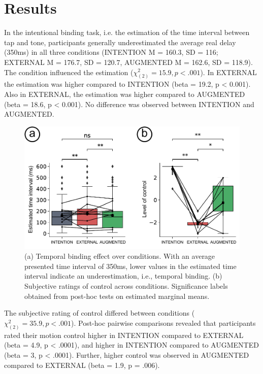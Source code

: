 \section{Results}
In the intentional binding task, i.e. the estimation of the time interval between tap and tone, participants generally underestimated the average real delay (350ms) in all three conditions (INTENTION M = 160.3, SD = 116; EXTERNAL M = 176.7, SD = 120.7, AUGMENTED M = 162.6, SD = 118.9). The condition influenced the estimation (${\chi^{2}_{(2)}} = 15.9, p < .001$). In EXTERNAL the estimation was higher compared to INTENTION (beta = 19.2, p < 0.001). Also in EXTERNAL, the estimation was higher compared to AUGMENTED (beta = 18.6, p < 0.001). No difference was observed between INTENTION and AUGMENTED.

\begin{figure}
    \centering
    \includegraphics[width=\columnwidth]{figures/behavioral_results.pdf}
    \caption{(a) Temporal binding effect over conditions. With an average presented time interval of 350ms, lower values in the estimated time interval indicate an underestimation, i.e., temporal binding. (b) Subjective ratings of control across conditions. Significance labels obtained from post-hoc tests on estimated marginal means.}
    \label{fig:results}
\end{figure}

The subjective rating of control differed between conditions (${\chi^{2}_{(2)}} = 35.9, p < .001$). Post-hoc pairwise comparisons revealed that participants rated their motion control higher in INTENTION compared to EXTERNAL (beta = 4.9, p < .0001), and higher in INTENTION compared to AUGMENTED (beta = 3, p < .0001). Further, higher control was observed in AUGMENTED compared to EXTERNAL (beta = 1.9, p = .006).

